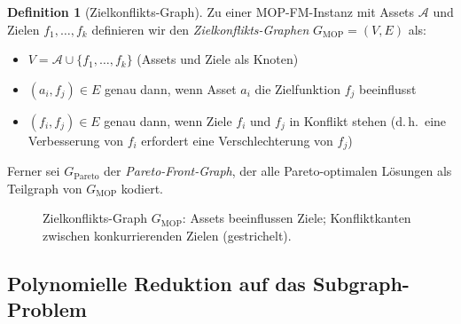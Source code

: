 ﻿\documentclass[a4paper,12pt]{article}
\theoremstyle{definition}
\newtheorem{definition}{Definition}[section]
\begin{document}
\begin{definition}[Zielkonflikts-Graph]
\label{def:zkg}
Zu einer MOP-FM-Instanz mit Assets $\mathcal{A}$ und Zielen $f_1, \ldots, f_k$
definieren wir den \emph{Zielkonflikts-Graphen} $G_{\mathrm{MOP}} = (V, E)$ als:
\begin{itemize}
    \item $V = \mathcal{A} \cup \{f_1, \ldots, f_k\}$ (Assets und Ziele als Knoten)
    \item $(a_i, f_j) \in E$ genau dann, wenn Asset $a_i$ die Zielfunktion $f_j$
          beeinflusst
    \item $(f_i, f_j) \in E$ genau dann, wenn Ziele $f_i$ und $f_j$ in Konflikt stehen
          (d.\,h.\ eine Verbesserung von $f_i$ erfordert eine Verschlechterung von $f_j$)
\end{itemize}
Ferner sei $G_{\mathrm{Pareto}}$ der \emph{Pareto-Front-Graph}, der alle Pareto-optimalen
Lösungen als Teilgraph von $G_{\mathrm{MOP}}$ kodiert.
\end{definition}

\begin{figure}[h]
\centering
{}
\caption{Zielkonflikts-Graph $G_{\mathrm{MOP}}$: Assets beeinflussen Ziele;
         Konfliktkanten zwischen konkurrierenden Zielen (gestrichelt).}
\label{fig:mop-graph}
\end{figure}

\subsection{Polynomielle Reduktion auf das Subgraph-Problem}
\end{document}
